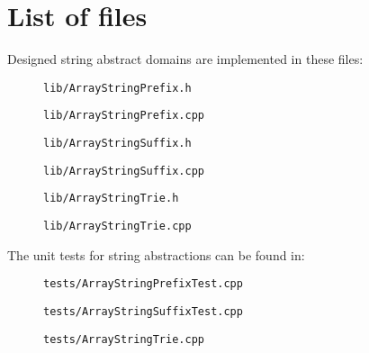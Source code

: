 \documentclass[12pt,final,oneside]{fithesis2}
\theoremstyle{definition}
\begin{document}
\chapter{List of files}

Designed string abstract domains are implemented in these files:

\begin{description}
\item[] \texttt{lib/ArrayStringPrefix.h}
\item[] \texttt{lib/ArrayStringPrefix.cpp}
\item[] \texttt{lib/ArrayStringSuffix.h}
\item[] \texttt{lib/ArrayStringSuffix.cpp}
\item[] \texttt{lib/ArrayStringTrie.h}
\item[] \texttt{lib/ArrayStringTrie.cpp}
\end{description}

The unit tests for string abstractions can be found in:

\begin{description}
\item[] \texttt{tests/ArrayStringPrefixTest.cpp}
\item[] \texttt{tests/ArrayStringSuffixTest.cpp}
\item[] \texttt{tests/ArrayStringTrie.cpp}
\end{description}


\end{document}
